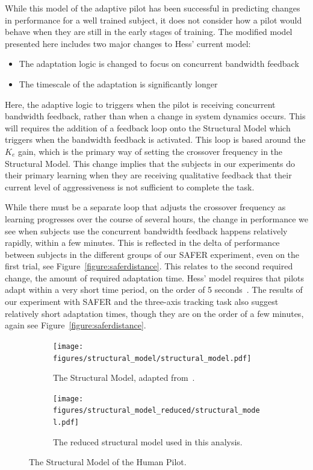 While this model of the adaptive pilot has been successful in predicting changes in performance for a well trained subject, it does not consider how a pilot would behave when they are still in the early stages of training.
The modified model presented here includes two major changes to Hess' current model:
\begin{itemize}
    \item The adaptation logic is changed to focus on concurrent bandwidth feedback
    \item The timescale of the adaptation is significantly longer
\end{itemize}

Here, the adaptive logic to triggers when the pilot is receiving concurrent bandwidth feedback, rather than when a change in system dynamics occurs.
This will requires the addition of a feedback loop onto the Structural Model which triggers when the bandwidth feedback is activated.
This loop is based around the $K_e$ gain, which is the primary way of setting the crossover frequency in the Structural Model.
This change implies that the subjects in our experiments do their primary learning when they are receiving qualitative feedback that their current level of aggressiveness is not sufficient to complete the task.

While there must be a separate loop that adjusts the crossover frequency as learning progresses over the course of several hours, the change in performance we see when subjects use the concurrent bandwidth feedback happens relatively rapidly, within a few minutes.
This is reflected in the delta of performance between subjects in the different groups of our SAFER experiment, even on the first trial, see Figure~\ref{figure:saferdistance}.
This relates to the second required change, the amount of required adaptation time.
Hess' model requires that pilots adapt within a very short time period, on the order of 5 seconds~\citep{weir_model_1966}.
The results of our experiment with SAFER and the three-axis tracking task also suggest relatively short adaptation times, though they are on the order of a few minutes, again see Figure~\ref{figure:saferdistance}.

\begin{figure}[t]
    \centering
    \begin{subfigure}[b]{\textwidth}
        \centering
        \texttt{[image: figures/structural\_model/structural\_model.pdf]}
        \caption[The Structural Model]{The Structural Model, adapted from~\citet{hess_unified_1997}.}
        \label{fig:structuralmodel}
    \end{subfigure}
    \hfill
    \begin{subfigure}[b]{\textwidth}
        \centering
        \texttt{[image: figures/structural\_model\_reduced/structural\_model.pdf]}
        \caption[The reduced structural model used in this analysis]{The reduced structural model used in this analysis.}
        \label{fig:structuralmodelreduced}
    \end{subfigure}
    \caption[The Structural Model of the Human Pilot]{The Structural Model of the Human Pilot.}
    \label{fig:structuralmodels}
\end{figure}

